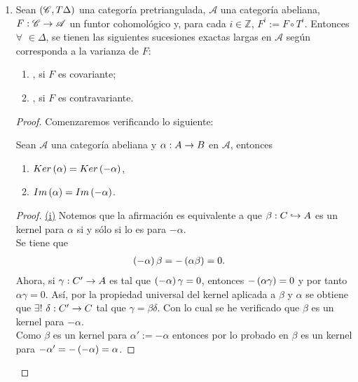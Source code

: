 \documentclass{article}
\begin{document}
\begin{enumerate}[label=\textbf{Ej \arabic*.}]
\begin{proof}
			\begin{center}
			\end{center}
			es decir, $\eta^{-(i+1)}\in \triangle$. Se concluye el ejercicio.\\
		\end{proof}
		\item Sean $\left(\mathscr{C},T\Delta\right)$ una categoría pretriangulada, $\mathscr{A}$ una categoría abeliana, $\catarrow{F}{\mathscr{C}}{\mathscr{A}}{}$ un funtor cohomológico y, para cada $i\in\mathbb{Z}$, $F^i:=F\circ T^i$. Entonces $\forall$ $\in\Delta$, se tienen las siguientes sucesiones exactas largas en $\mathscr{A}$ según corresponda a la varianza de $F$:
		\begin{enumerate}[label=(\textit{\alph*})]
			\item {}, si $F$ es covariante;
			\item {}, si $F$ es contravariante.
		\end{enumerate}
		\begin{proof}
			Comenzaremos verificando lo siguiente:
			\begin{lemsn}
				Sean $\mathscr{A}$ una categoría abeliana y $\catarrow{\alpha}{A}{B}{}$ en $\mathscr{A}$, entonces \begin{enumerate}[label=(\roman*)]
					\item $Ker\left(\alpha\right)=Ker\left(-\alpha\right)$,
					\item $Im\left(\alpha\right)=Im\left(-\alpha\right)$.
				\end{enumerate}
			\end{lemsn}
			\begin{proof}
				\underline{(i)} Notemos que la afirmación es equivalente a que $\catarrow{\beta}{C}{A}{m}$ es un kernel para $\alpha$ si y sólo si lo es para $-\alpha$.\\ 
				\boxed{\implies} Se tiene que
				\begin{align*}
					\left(-\alpha\right)\beta&=-\left(\alpha\beta\right)=0.
				\end{align*}
			Ahora, si $\catarrow{\gamma}{C'}{A}{}$ es tal que $\left(-\alpha\right)\gamma=0$, entonces $-\left(\alpha\gamma\right)=0$ y por tanto $\alpha\gamma=0$. Así, por la propiedad universal del kernel aplicada a $\beta$ y $\alpha$ se obtiene que $\exists !$ $\catarrow{\delta}{C'}{C}{}$ tal que
			 $\gamma=\beta\delta$. Con lo cual se he verificado que $\beta$ es un kernel para $-\alpha$.\\
			 \boxed{\impliedby} Como $\beta$ es un kernel para $\alpha':=-\alpha$ entonces por lo probado en \boxed{\implies} $\beta$ es un kernel para $-\alpha'=-\left(-\alpha\right)=\alpha$.
			 

\end{proof}
\end{proof}
\end{enumerate}
\end{document}
